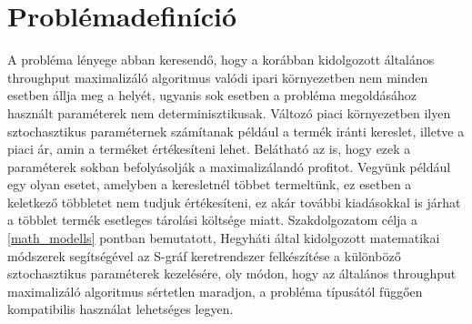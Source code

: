 \chapter{Problémadefiníció}
A probléma lényege abban keresendő, hogy a korábban kidolgozott általános throughput maximalizáló algoritmus \cite{phd_Hegyhati} valódi ipari környezetben nem minden esetben állja meg a helyét, ugyanis sok esetben a probléma megoldásához használt paraméterek nem determinisztikusak. Változó piaci környezetben ilyen sztochasztikus paraméternek számítanak például a termék iránti kereslet, illetve a piaci ár, amin a terméket értékesíteni lehet. Belátható az is, hogy ezek a paraméterek sokban befolyásolják a maximalizálandó profitot. Vegyünk például egy olyan esetet, amelyben a keresletnél többet termeltünk, ez esetben a keletkező többletet nem tudjuk értékesíteni, ez akár további kiadásokkal is járhat a többlet termék esetleges tárolási költsége miatt. Szakdolgozatom célja a \ref{math_modells} pontban bemutatott, Hegyháti által kidolgozott \cite{phd_Hegyhati} matematikai módszerek segítségével az S-gráf keretrendszer felkészítése a különböző sztochasztikus paraméterek kezelésére, oly módon, hogy az általános throughput maximalizáló algoritmus sértetlen maradjon, a probléma típusától függően kompatibilis használat lehetséges legyen.
